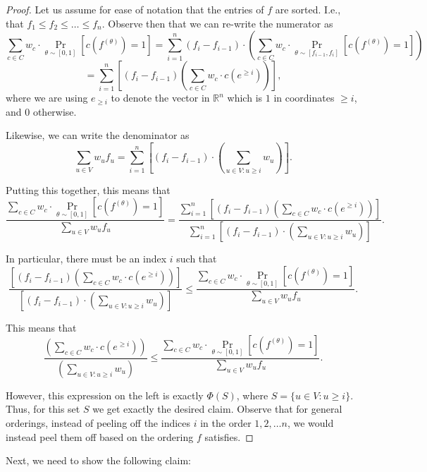 \documentclass[11pt]{article}
\theoremstyle{definition}
\newcommand{\R}{\mathbb{R}}
\begin{document}
\begin{proof}
    Let us assume for ease of notation that the entries of $f$ are sorted. I.e., that $f_1 \leq f_2 \leq \dots \leq f_n$. Observe then that we can re-write the numerator as
    \[
    \sum_{c \in C} w_c \cdot \Pr_{\theta \sim [0,1]}[c(f^{(\theta)}) = 1] = \sum_{i = 1}^n (f_i - f_{i-1}) \cdot (\sum_{c \in C} w_c \cdot \Pr_{\theta \sim [f_{i-1},f_i]}[c(f^{(\theta)}) = 1]) 
    \]
    \[
    = \sum_{i = 1}^n \left [\left(f_i - f_{i-1}\right)\left(\sum_{c \in C} w_c \cdot c(e^{\geq i}) \right)\right],
    \]
    where we are using $e_{\geq i}$ to denote the vector in $\R^n$ which is $1$ in coordinates $\geq i$, and $0$ otherwise. 

    Likewise, we can write the denominator as 
    \[
    \sum_{u \in V } w_u f_u = \sum_{i = 1}^n \left [ \left(f_{i} - f_{i-1}\right) \cdot \left(\sum_{u \in V: u \geq i} w_u\right) \right].
    \]

    Putting this together, this means that 
    \[
    \frac{\sum_{c \in C} w_c \cdot \Pr_{\theta \sim [0,1]}[c(f^{(\theta)}) = 1]}{\sum_{u \in V} w_u f_u} = \frac{\sum_{i = 1}^n \left [\left(f_i - f_{i-1}\right)\left(\sum_{c \in C} w_c \cdot c(e^{\geq i}) \right)\right]}{\sum_{i = 1}^n \left [ \left(f_{i} - f_{i-1}\right) \cdot \left(\sum_{u \in V: u \geq i} w_u\right) \right]}.
    \]

    In particular, there must be an index $i$ such that
    \[
    \frac{\left [\left(f_i - f_{i-1}\right)\left(\sum_{c \in C} w_c \cdot c(e^{\geq i}) \right)\right]}{\left [ \left(f_{i} - f_{i-1}\right) \cdot \left(\sum_{u \in V: u \geq i} w_u\right) \right]} \leq  \frac{\sum_{c \in C} w_c \cdot \Pr_{\theta \sim [0,1]}[c(f^{(\theta)}) = 1]}{\sum_{u \in V} w_u f_u}.
    \]

    This means that 
    \[
    \frac{\left(\sum_{c \in C} w_c \cdot c(e^{\geq i}) \right)}{  \left(\sum_{u \in V: u \geq i} w_u\right) } \leq  \frac{\sum_{c \in C} w_c \cdot \Pr_{\theta \sim [0,1]}[c(f^{(\theta)}) = 1]}{\sum_{u \in V} w_u f_u}.
    \]

    However, this expression on the left is exactly $\Phi(S)$, where $S = \{ u \in V: u \geq i\}$. Thus, for this set $S$ we get exactly the desired claim. Observe that for general orderings, instead of peeling off the indices $i$ in the order $1, 2, \dots n$, we would instead peel them off based on the ordering $f$ satisfies. 
\end{proof}

Next, we need to show the following claim: 
\end{document}
